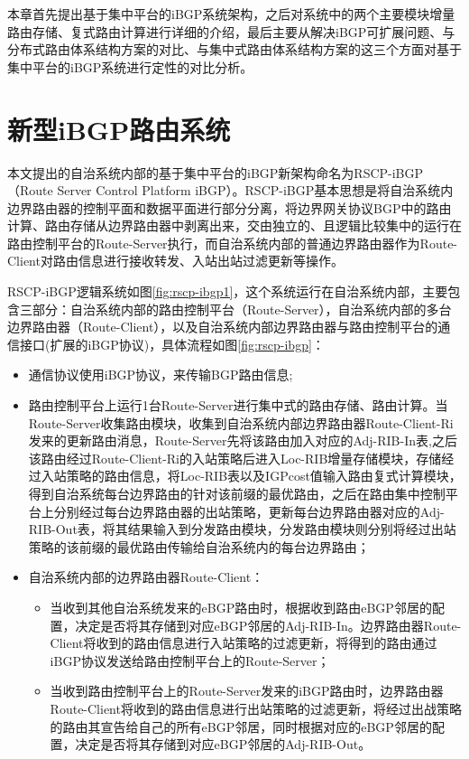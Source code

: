 本章首先提出基于集中平台的iBGP系统架构，之后对系统中的两个主要模块增量路由存储、复式路由计算进行详细的介绍，最后主要从解决iBGP可扩展问题、与分布式路由体系结构方案的对比、与集中式路由体系结构方案的这三个方面对基于集中平台的iBGP系统进行定性的对比分析。








\section{新型iBGP路由系统}
本文提出的自治系统内部的基于集中平台的iBGP新架构命名为RSCP-iBGP（Route Server Control Platform iBGP）。RSCP-iBGP基本思想是将自治系统内边界路由器的控制平面和数据平面进行部分分离，将边界网关协议BGP中的路由计算、路由存储从边界路由器中剥离出来，交由独立的、且逻辑比较集中的运行在路由控制平台的Route-Server执行，而自治系统内部的普通边界路由器作为Route-Client对路由信息进行接收转发、入站出站过滤更新等操作。

RSCP-iBGP逻辑系统如图\ref{fig:rscp-ibgp1}，这个系统运行在自治系统内部，主要包含三部分：自治系统内部的路由控制平台（Route-Server），自治系统内部的多台边界路由器（Route-Client），以及自治系统内部边界路由器与路由控制平台的通信接口(扩展的iBGP协议)，具体流程如图\ref{fig:rscp-ibgp}：
\begin{itemize}
  \item 通信协议使用iBGP协议，来传输BGP路由信息;
  \item 路由控制平台上运行1台Route-Server进行集中式的路由存储、路由计算。当Route-Server收集路由模块，收集到自治系统内部边界路由器Route-Client-Ri发来的更新路由消息，Route-Server先将该路由加入对应的Adj-RIB-In表,之后该路由经过Route-Client-Ri的入站策略后进入Loc-RIB增量存储模块，存储经过入站策略的路由信息，将Loc-RIB表以及IGPcost值输入路由复式计算模块，得到自治系统每台边界路由的针对该前缀的最优路由，之后在路由集中控制平台上分别经过每台边界路由器的出站策略，更新每台边界路由器对应的Adj-RIB-Out表，将其结果输入到分发路由模块，分发路由模块则分别将经过出站策略的该前缀的最优路由传输给自治系统内的每台边界路由；
  \item 自治系统内部的边界路由器Route-Client：
        \begin{itemize}
          \item 当收到其他自治系统发来的eBGP路由时，根据收到路由eBGP邻居的配置，决定是否将其存储到对应eBGP邻居的Adj-RIB-In。边界路由器Route-Client将收到的路由信息进行入站策略的过滤更新，将得到的路由通过iBGP协议发送给路由控制平台上的Route-Server；
          \item 当收到路由控制平台上的Route-Server发来的iBGP路由时，边界路由器Route-Client将收到的路由信息进行出站策略的过滤更新，将经过出战策略的路由其宣告给自己的所有eBGP邻居，同时根据对应的eBGP邻居的配置，决定是否将其存储到对应eBGP邻居的Adj-RIB-Out。
        \end{itemize}
\end{itemize}

